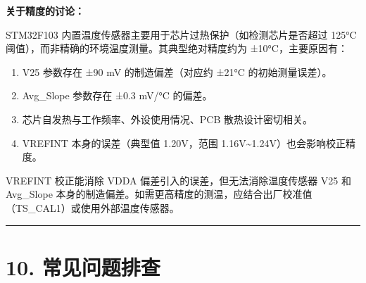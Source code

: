 \documentclass[
  chinese,
  UTF8,
  oneside,
  openany]{ctexbook}
\providecommand{\tightlist}{%
  \setlength{\itemsep}{0pt}\setlength{\parskip}{0pt}}
\begin{document}
\textbf{关于精度的讨论：}

STM32F103 内置温度传感器主要用于芯片过热保护（如检测芯片是否超过 125°C
阈值），而非精确的环境温度测量。其典型绝对精度约为 ±10°C，主要原因有：

\begin{enumerate}
\def\labelenumi{\arabic{enumi}.}
\tightlist
\item
  V25 参数存在 ±90 mV 的制造偏差（对应约 ±21°C 的初始测量误差）。
\item
  Avg\_Slope 参数存在 ±0.3 mV/°C 的偏差。
\item
  芯片自发热与工作频率、外设使用情况、PCB 散热设计密切相关。
\item
  VREFINT 本身的误差（典型值 1.20V，范围
  1.16V\textasciitilde1.24V）也会影响校正精度。
\end{enumerate}

VREFINT 校正能消除 VDDA 偏差引入的误差，但无法消除温度传感器 V25 和
Avg\_Slope
本身的制造偏差。如需更高精度的测温，应结合出厂校准值（TS\_CAL1）或使用外部温度传感器。

\begin{center}\rule{0.5\linewidth}{0.5pt}\end{center}

\section{10. 常见问题排查}\label{ux5e38ux89c1ux95eeux9898ux6392ux67e5-1}
\end{document}
